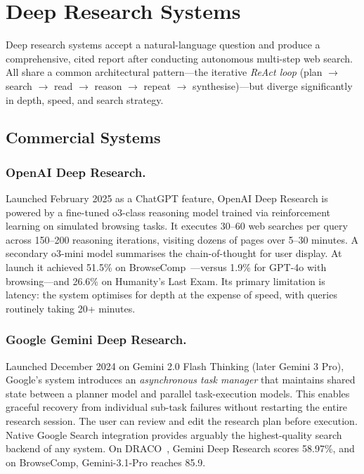 \documentclass[11pt,a4paper]{article}
\begin{document}
\section{Deep Research Systems}
\label{sec:deep}

Deep research systems accept a natural-language question and produce a
comprehensive, cited report after conducting autonomous multi-step web
search. All share a common architectural pattern---the iterative
\emph{ReAct loop} (plan $\to$ search $\to$ read $\to$ reason $\to$
repeat $\to$ synthesise)---but diverge significantly in depth, speed,
and search strategy.

\subsection{Commercial Systems}

\subsubsection{OpenAI Deep Research.}
Launched February 2025 as a ChatGPT feature, OpenAI Deep Research is
powered by a fine-tuned o3-class reasoning model trained via
reinforcement learning on simulated browsing tasks. It executes
30--60 web searches per query across 150--200 reasoning iterations,
visiting dozens of pages over 5--30 minutes. A secondary o3-mini model
summarises the chain-of-thought for user display. At launch it achieved
51.5\% on BrowseComp~\citep{browsecomp2025}---versus 1.9\% for GPT-4o
with browsing---and 26.6\% on Humanity's Last Exam. Its primary
limitation is latency: the system optimises for depth at the expense of
speed, with queries routinely taking 20+ minutes.

\subsubsection{Google Gemini Deep Research.}
Launched December 2024 on Gemini 2.0 Flash Thinking (later Gemini 3
Pro), Google's system introduces an \emph{asynchronous task manager}
that maintains shared state between a planner model and parallel
task-execution models. This enables graceful recovery from individual
sub-task failures without restarting the entire research session.
The user can review and edit the research plan before execution. Native
Google Search integration provides arguably the highest-quality search
backend of any system. On DRACO~\citep{draco2026}, Gemini Deep Research
scores 58.97\%, and on BrowseComp, Gemini-3.1-Pro reaches 85.9.
\end{document}
